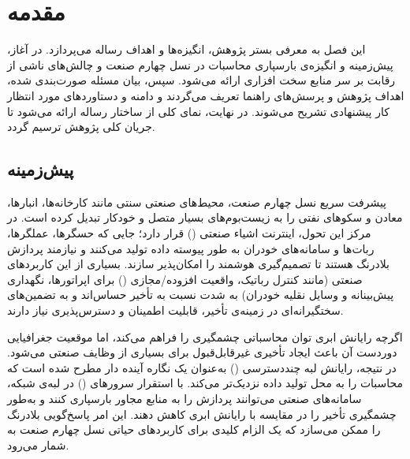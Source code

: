
\chapter{مقدمه}\label{chap:intro}

این فصل به معرفی بستر پژوهش، انگیزه‌ها و اهداف رساله می‌پردازد. در آغاز، پیش‌زمینه و انگیزه‌ی بارسپاری محاسبات در نسل چهارم صنعت و چالش‌های ناشی از رقابت بر سر منابع سخت افزاری ارائه می‌شود. سپس، بیان مسئله صورت‌بندی شده، اهداف پژوهش و پرسش‌های راهنما تعریف می‌گردند و دامنه و دستاوردهای مورد انتظار کار پیشنهادی تشریح می‌شوند. در نهایت، نمای کلی از ساختار رساله ارائه می‌شود تا جریان کلی پژوهش ترسیم گردد.

\section{پیش‌زمینه}

پیشرفت سریع نسل‌ چهارم صنعت، محیط‌های صنعتی سنتی مانند کارخانه‌ها، انبارها، معادن و سکوهای نفتی را به زیست‌بوم‌های بسیار متصل و خودکار تبدیل کرده است.  در مرکز این تحول، اینترنت اشیاء صنعتی () قرار دارد؛ جایی که حسگرها، عملگرها، ربات‌ها و سامانه‌های خودران به طور پیوسته داده تولید می‌کنند و نیازمند پردازش بلادرنگ هستند تا تصمیم‌گیری هوشمند را امکان‌پذیر سازند. بسیاری از این کاربردهای صنعتی (مانند کنترل رباتیک، واقعیت افزوده/مجازی () برای اپراتورها، نگهداری پیش‌بینانه و وسایل نقلیه خودران) به شدت نسبت به تأخیر حساس‌اند و به تضمین‌های سختگیرانه‌ای در زمینه‌ی تأخیر، قابلیت اطمینان و دسترس‌پذیری نیاز دارند.

اگرچه رایانش ابری توان محاسباتی چشمگیری را فراهم می‌کند، اما موقعیت جغرافیایی دوردست آن باعث ایجاد تأخیری غیرقابل‌قبول برای بسیاری از وظایف صنعتی می‌شود. در نتیجه، رایانش لبه چنددسترسی () به‌عنوان یک نگاره آینده دار مطرح شده است که محاسبات را به محل تولید داده نزدیک‌تر می‌کند. با استقرار سرورهای ()  در لبه‌ی شبکه، سامانه‌های صنعتی می‌توانند پردازش را به منابع مجاور بار‌سپاری کنند و به‌طور چشمگیری تأخیر را در مقایسه با رایانش ابری کاهش دهند. این امر پاسخ‌گویی بلادرنگ را ممکن می‌سازد که یک الزام کلیدی برای کاربردهای حیاتی نسل چهارم صنعت به شمار می‌رود.

